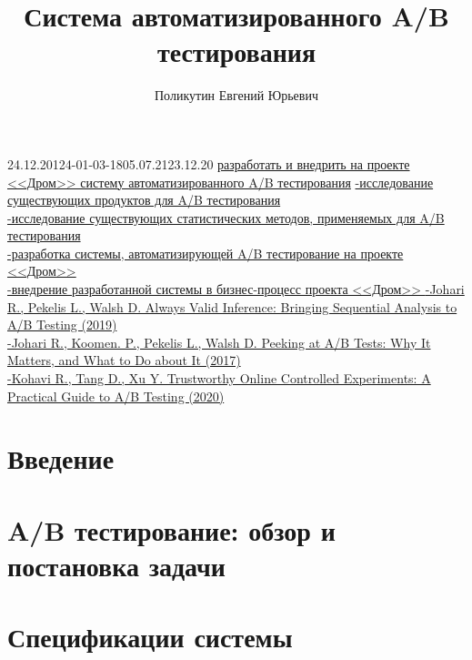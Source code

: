 \documentclass{fefu}
\author{Поликутин Евгений Юрьевич}
\title{Система автоматизированного A/B тестирования}
\begin{document}
    \makethesistitlebackside[1.2]
    \begin{thesistask}{24.12.20}{124-01-03-18}{05.07.21}{23.12.20}
    	\taskitem \uline{разработать и внедрить на проекте <<Дром>> систему автоматизированного A/B тестирования}
    	\taskitem \uline{
    		-исследование существующих продуктов для A/B тестирования\\
    		-исследование существующих статистических методов, применяемых для A/B тестирования\\
    		-разработка системы, автоматизирующей A/B тестирование на проекте <<Дром>>\\
    		-внедрение разработанной системы в бизнес-процесс проекта <<Дром>>
    	}
    	\taskitem \uline{
    		-Johari R., Pekelis L., Walsh D. Always Valid Inference: Bringing Sequential Analysis to A/B Testing (2019)\\
    		-Johari R., Koomen. P., Pekelis L., Walsh D. Peeking at A/B Tests: Why It Matters, and What to Do about It (2017)\\
    		-Kohavi R., Tang D., Xu Y. Trustworthy Online Controlled Experiments: A Practical Guide to A/B Testing (2020)
    	}
    \end{thesistask}
    \begin{abstract}
    	
    \end{abstract}
    \tableofcontents
    \section*{Введение}
    
    \newpage
    \printglossary[type=main,title={Глоссарий}]
    \newpage
    \section{A/B тестирование: обзор и постановка задачи}
    
    \newpage
    \section{Спецификации системы}
    
    \newpage
\end{document}
